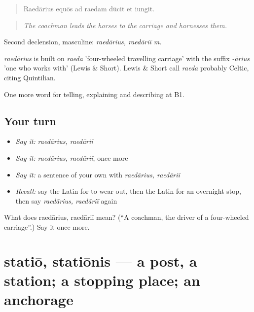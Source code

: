 \begin{quote}
Raedārius equōs ad raedam dūcit et iungit.
\end{quote}

\begin{quote}
\emph{The coachman leads the horses to the carriage and harnesses them.}
\end{quote}

Second declension, masculine: \emph{raedārius, raedāriī m.}

\begin{cousinweb}
\emph{raedārius} is built on \emph{raeda} 'four-wheeled travelling carriage' with the suffix \emph{-ārius} 'one who works with' (Lewis \& Short). Lewis \& Short call \emph{raeda} probably Celtic, citing Quintilian.
\end{cousinweb}

\begin{grammarlens}[title={What you've built}]
One more word for telling, explaining and describing at B1.
\end{grammarlens}

\subsection*{Your turn}
\begin{itemize}
\raggedright
  \item \emph{Say it:} \emph{raedārius, raedāriī}
  \item \emph{Say it:} \emph{raedārius, raedāriī}, once more
  \item \emph{Say it:} a sentence of your own with \emph{raedārius, raedāriī}
  \item \emph{Recall:} say the Latin for to wear out, then the Latin for an overnight stop, then say \emph{raedārius, raedāriī} again
\end{itemize}

\begin{tcolorbox}[breakable,colback=teal!4,colframe=teal!35!black,title={Before you move on}]
What does raedārius, raedāriī mean? (\textquotedblleft{}A coachman, the driver of a four-wheeled carriage\textquotedblright{}.) Say it once more.
\end{tcolorbox}
\section[statiō, statiōnis]{statiō, statiōnis — a post, a station; a stopping place; an anchorage}

\label{lesson:LA-C427-statio}



